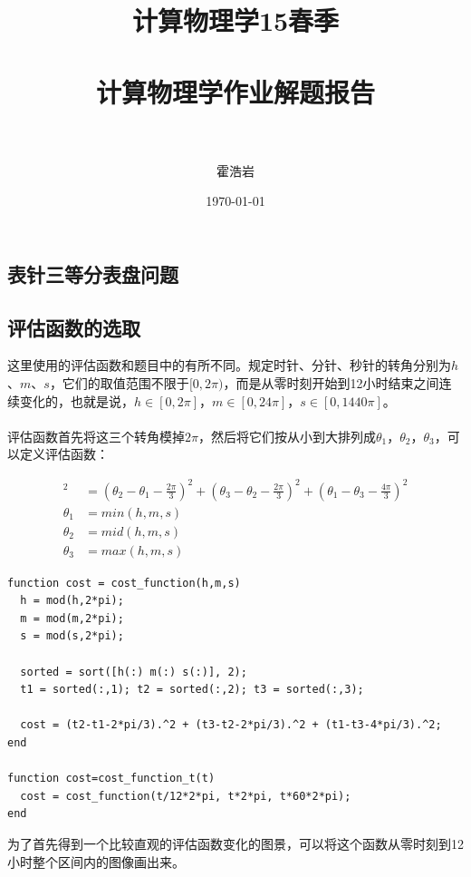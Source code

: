 \documentclass[paper=a4, fontsize=11pt]{scrartcl} %
\title{
\normalfont \normalsize 
\textsc{计算物理学15春季} \\ [25pt] %
\horrule{0.5pt} \\[0.4cm] %
\huge 计算物理学作业解题报告 \\ %
\horrule{2pt} \\[0.5cm] %
}
\author{霍浩岩} %
\date{\normalsize\today} %
\numberwithin{equation}{section} %
\numberwithin{figure}{section} %
\numberwithin{table}{section} %
\begin{document}
\begin{CJK*}{UTF8}{gbsn}

\maketitle %


\section{表针三等分表盘问题}

\subsection{评估函数的选取}
这里使用的评估函数和题目中的有所不同。规定时针、分针、秒针的转角分别为$h$、$m$、$s$，它们的取值范围不限于$[0,2\pi)$，而是从零时刻开始到12小时结束之间连续变化的，也就是说，$h\in [0,2\pi]$，$m\in [0,24\pi]$，$s\in [0,1440\pi]$。\\\\
评估函数首先将这三个转角模掉$2\pi$，然后将它们按从小到大排列成$\theta_1$，$\theta_2$，$\theta_3$，可以定义评估函数：

\begin{align}
[f(h,m,s)]^2 
&= (\theta_2-\theta_1-\frac{2\pi}{3})^2 + (\theta_3-\theta_2-\frac{2\pi}{3})^2 + (\theta_1-\theta_3-\frac{4\pi}{3})^2 \\
\theta_1 &= min(h,m,s) \\
\theta_2 &= mid(h,m,s) \\
\theta_3 &= max(h,m,s)
\end{align}

\lstset{language=MATLAB}
\begin{lstlisting}
function cost = cost_function(h,m,s)
  h = mod(h,2*pi);
  m = mod(m,2*pi);
  s = mod(s,2*pi);

  sorted = sort([h(:) m(:) s(:)], 2);
  t1 = sorted(:,1); t2 = sorted(:,2); t3 = sorted(:,3);

  cost = (t2-t1-2*pi/3).^2 + (t3-t2-2*pi/3).^2 + (t1-t3-4*pi/3).^2;
end

function cost=cost_function_t(t)
  cost = cost_function(t/12*2*pi, t*2*pi, t*60*2*pi);
end
\end{lstlisting}

为了首先得到一个比较直观的评估函数变化的图景，可以将这个函数从零时刻到12小时整个区间内的图像画出来。


\end{CJK*}
\end{document}

